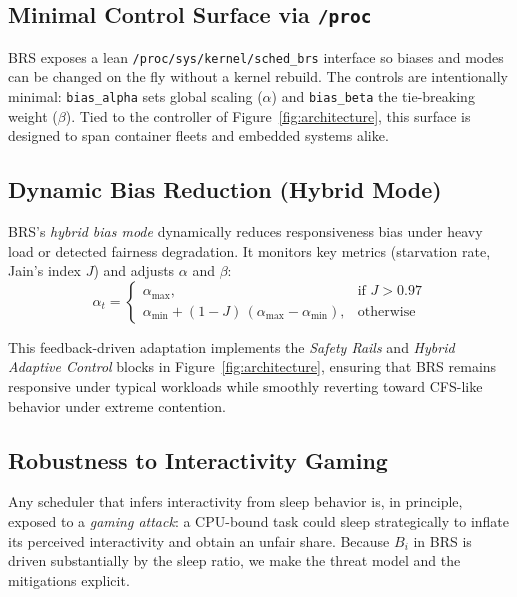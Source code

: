 \subsection{Minimal Control Surface via \texttt{/proc}}
BRS exposes a lean \texttt{/proc/sys/kernel/sched\_brs} interface so biases and modes can be changed on the fly without a kernel rebuild. The controls are intentionally minimal: \texttt{bias\_alpha} sets global scaling ($\alpha$) and \texttt{bias\_beta} the tie-breaking weight ($\beta$). Tied to the controller of Figure~\ref{fig:architecture}, this surface is designed to span container fleets and embedded systems alike.

\subsection{Dynamic Bias Reduction (Hybrid Mode)}
\label{subsec:hybrid}
BRS's \emph{hybrid bias mode} dynamically reduces responsiveness bias under heavy load or detected fairness degradation. It monitors key metrics (starvation rate, Jain's index $J$) and adjusts $\alpha$ and $\beta$:
\[
\alpha_t =
\begin{cases}
\alpha_{\max}, & \text{if } J > 0.97 \\
\alpha_{\min} + (1 - J)\,(\alpha_{\max} - \alpha_{\min}), &
\text{otherwise}
\end{cases}
\]

This feedback-driven adaptation implements the \emph{Safety Rails} and
\emph{Hybrid Adaptive Control} blocks in
Figure~\ref{fig:architecture}, ensuring that BRS remains responsive under
typical workloads while smoothly reverting toward CFS-like behavior under
extreme contention.

\subsection{Robustness to Interactivity Gaming}
\label{subsec:gaming}
Any scheduler that infers interactivity from sleep behavior is, in principle, exposed to a \emph{gaming attack}: a CPU-bound task could sleep strategically to inflate its perceived interactivity and obtain an unfair share. Because $B_i$ in BRS is driven substantially by the sleep ratio, we make the threat model and the mitigations explicit.

